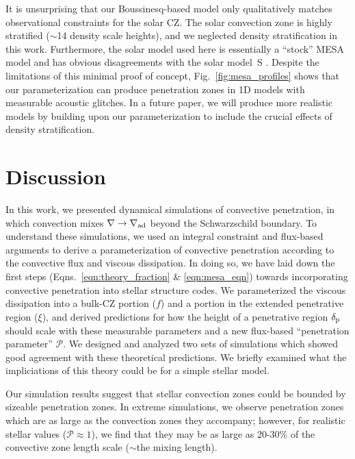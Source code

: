 \documentclass[twocolumn]{aastex631}
\newcommand{\gradad}{\ensuremath{\nabla_{\rm{ad}}}}
\newcommand{\justgrad}{\ensuremath{\nabla}}
\newcommand{\delp}{\ensuremath{\delta_{\rm{p}}}}
\newcommand{\mP}{\ensuremath{\mathcal{P}}}
\begin{document}
It is unsurprising that our Boussinesq-based model only qualitatively matches observational constraints for the solar CZ.
The solar convection zone is highly stratified ($\sim$14 density scale heights), and we neglected density stratification in this work.
Furthermore, the solar model used here is essentially a ``stock'' MESA model and has obvious disagreements with the solar model~S \citep[see Fig.~1 in][where the Schwarzschild base of the CZ is $r/R_\odot \approx 0.712$, whereas the one in Fig.~\ref{fig:mesa_profiles} is at $r/R_{\odot} \approx 0.75$]{christensen-dalsgaard_etal_2011}.
Despite the limitations of this minimal proof of concept, Fig.~\ref{fig:mesa_profiles} shows that our parameterization can produce penetration zones in 1D models with measurable acoustic glitches.
In a future paper, we will produce more realistic models by building upon our parameterization to include the crucial effects of density stratification.


\section{Discussion}
\label{sec:discussion}
In this work, we presented dynamical simulations of convective penetration, in which convection mixes ${\justgrad \rightarrow \gradad}$ beyond the Schwarzschild boundary.
To understand these simulations, we used an integral constraint \citep[reminiscent of][]{roxburgh1989} and flux-based arguments \citep[similar to][]{zahn1991} to derive a parameterization of convective penetration according to the convective flux and viscous dissipation.
In doing so, we have laid down the first steps (Eqns.~\ref{eqn:theory_fraction} \& \ref{eqn:mesa_eqn}) towards incorporating convective penetration into stellar structure codes.
We parameterized the viscous dissipation into a bulk-CZ portion ($f$) and a portion in the extended penetrative region ($\xi$), and derived predictions for how the height of a penetrative region $\delp$ should scale with these measurable parameters and a new flux-based ``penetration parameter'' $\mP$.
We designed and analyzed two sets of simulations which showed good agreement with these theoretical predictions.
We briefly examined what the impliciations of this theory could be for a simple stellar model.

Our simulation results suggest that stellar convection zones could be bounded by sizeable penetration zones.
In extreme simulations, we observe penetration zones which are as large as the convection zones they accompany; however, for realistic stellar values ($\mP \approx 1$), we find that they may be as large as 20-30\% of the convective zone length scale ($\sim$the mixing length).
\end{document}
